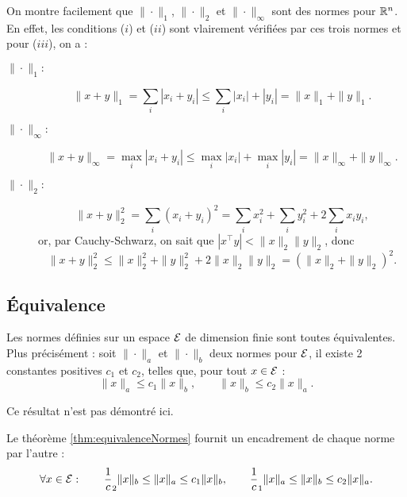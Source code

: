 
\remark
On montre facilement que $\|\cdot\|_1$, $\|\cdot\|_2$ et $\|\cdot\|_\infty$ sont des normes pour $\mathbb{R}^n$. En effet, les conditions ($i$) et ($ii$) sont vlairement vérifiées par ces trois normes et pour ($iii$), on a :
\begin{description}
  \item[$\|\cdot\|_1:$] 
  $$\|x+y\|_1 = \sum_i |x_i + y_i| \leq \sum_i |x_i| + |y_i| =  \|x\|_1 + \|y\|_1.$$
  \item[$\|\cdot\|_\infty:$] 
  $$\|x+y\|_\infty = \max_i |x_i + y_i| \leq \max_i |x_i| + \max_i |y_i| =  \|x\|_\infty + \|y\|_\infty.$$
  \item[$\|\cdot\|_2:$] 
  $$\|x+y\|^2_2 = \sum_i (x_i + y_i)^2 = \sum_i x_i^2 + \sum_i y_i^2 + 2 \sum_i x_i y_i,$$ 
  or, par Cauchy-Schwarz, on sait que $|x^\top y| < \|x\|_2 \|y\|_2$, donc 
  $$\|x+y\|^2_2 \leq \|x\|_2^2 + \|y\|_2^2 + 2 \|x\|_2 \|y\|_2 = (\|x\|_2 + \|y\|_2)^2.$$
\end{description}

\subsection{\'Equivalence} 

\begin{theorem} \label{thm:equivalenceNormes}
  Les normes définies sur un espace $\mathcal{E}$ de dimension finie sont toutes équivalentes. Plus précisément : soit $\|\cdot\|_a$ et $\|\cdot\|_b$ deux normes pour $\mathcal{E}$, il existe 2 constantes positives $c_1$ et $c_2$, telles que, pour tout $x \in \mathcal{E}$ :
  $$
  \|x\|_a \leq c_1 \|x\|_b, \qquad
  \|x\|_b \leq c_2 \|x\|_a.
  $$
\end{theorem}

Ce résultat n'est pas démontré ici. \eproof

\remark
Le théorème \ref{thm:equivalenceNormes} fournit un encadrement de chaque norme par l'autre : 
$$
\forall x \in \mathcal{E}: \qquad
\frac1c_2 \|x\|_b \leq \|x\|_a \leq c_1 \|x\|_b, \qquad
\frac1c_1 \|x\|_a \leq \|x\|_b \leq c_2 \|x\|_a.
$$


